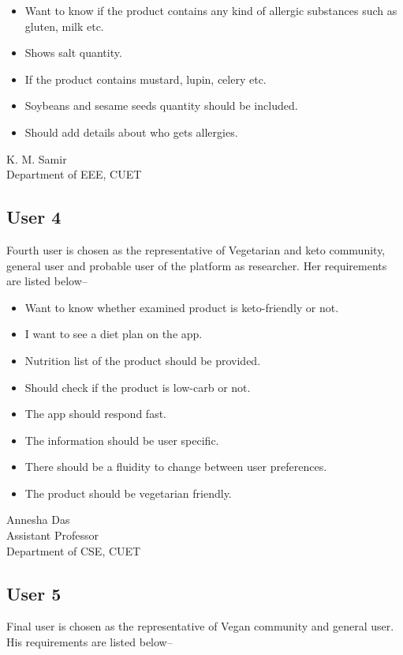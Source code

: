\documentclass[a4paper,12pt]{report}
\begin{document}
\parbox{.7\linewidth}{
	\begin{itemize}
		\item Want to know if the product contains any kind of allergic substances such as gluten, milk etc.
		\item Shows salt quantity.
		\item If the product contains mustard, lupin, celery etc.
		\item Soybeans and sesame seeds quantity should be included.
		\item Should add details about who gets allergies.
	\end{itemize}}
\parbox[m]{.3\linewidth}{
\raggedleft
K. M. Samir\\
{\footnotesize
Department of EEE, CUET}
}

\subsection*{User 4}
Fourth user is chosen as the representative of Vegetarian and keto community, general user and probable user of the platform as researcher. Her requirements are listed below--

\parbox{.69\linewidth}{
	\begin{itemize}
		\item Want to know whether examined product is keto-friendly or not.
		\item I want to see a diet plan on the app.
		\item Nutrition list of the product should be provided.
		\item Should check if the product is low-carb or not.
		\item The app should respond fast.
		\item The information should be user specific.
		\item There should be a fluidity to change between user preferences.
		\item The product should be vegetarian friendly.
	\end{itemize}}
\parbox[m]{.3\linewidth}{
\raggedleft
Annesha Das\\
{\footnotesize
Assistant Professor \\
Department of CSE, CUET}\\
}

\subsection*{User 5}
Final user is chosen as the representative of Vegan community and general user. His requirements are listed below--
\end{document}
